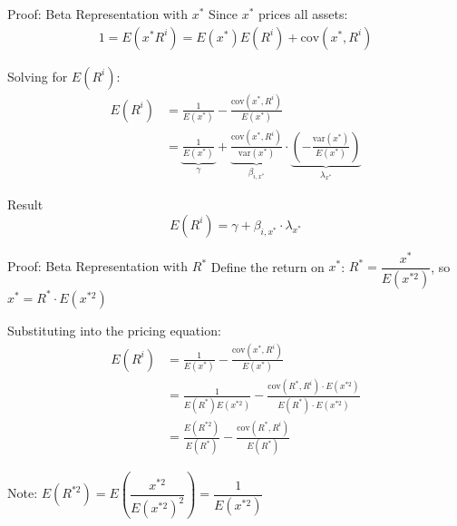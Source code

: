 \documentclass{beamer}
\begin{document}
\begin{frame}{Proof: Beta Representation with $x^*$}
	Since $x^*$ prices all assets:
	\begin{align*}
		1 = E(x^* R^i) = E(x^*)E(R^i) + \text{cov}(x^*, R^i)
	\end{align*}
	
	Solving for $E(R^i)$:
	\begin{align*}
		E(R^i) &= \frac{1}{E(x^*)} - \frac{\text{cov}(x^*, R^i)}{E(x^*)} \\[8pt]
		&= \underbrace{\frac{1}{E(x^*)}}_{\gamma} + \underbrace{\frac{\text{cov}(x^*, R^i)}{\text{var}(x^*)}}_{\beta_{i,x^*}} \cdot \underbrace{\left(-\frac{\text{var}(x^*)}{E(x^*)}\right)}_{\lambda_{x^*}}
	\end{align*}
	
	\vspace{5pt}
	\begin{block}{Result}
		\vspace{-5pt}
		\begin{equation*}
			E(R^i) = \gamma + \beta_{i,x^*} \cdot \lambda_{x^*}
		\end{equation*}
	\end{block}
\end{frame}

\begin{frame}{Proof: Beta Representation with $R^*$}
	Define the return on $x^*$: $R^* = \dfrac{x^*}{E(x^{*2})}$, so $x^* = R^* \cdot E(x^{*2})$
	
	\vspace{5pt}
	Substituting into the pricing equation:
	\begin{align*}
		E(R^i) &= \frac{1}{E(x^*)} - \frac{\text{cov}(x^*, R^i)}{E(x^*)} \\[6pt]
		&= \frac{1}{E(R^*)E(x^{*2})} - \frac{\text{cov}(R^*, R^i) \cdot E(x^{*2})}{E(R^*) \cdot E(x^{*2})} \\[6pt]
		&= \frac{E(R^{*2})}{E(R^*)} - \frac{\text{cov}(R^*, R^i)}{E(R^*)}
	\end{align*}
	
	Note: $E(R^{*2}) = E\left(\dfrac{x^{*2}}{E(x^{*2})^2}\right) = \dfrac{1}{E(x^{*2})}$
\end{frame}
\end{document}
